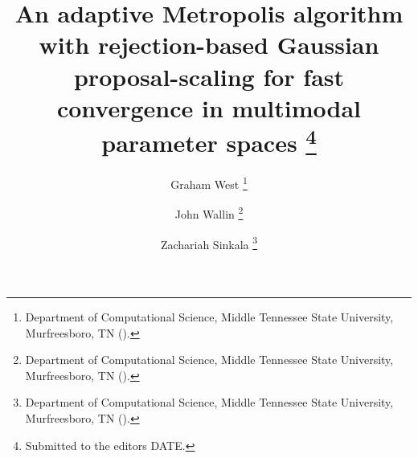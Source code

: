 

\usepackage{lipsum}
\usepackage{amsfonts}
\usepackage{graphicx}
\usepackage{epstopdf}
\usepackage{algorithmic}

\usepackage{textpos}
\usepackage{verbatim}
\usepackage{textcomp}
\usepackage{varwidth}
\ifpdf
\else
\fi

\usepackage{enumitem}

\newcommand{\creflastconjunction}{, and~}



\title{An adaptive Metropolis algorithm with rejection-based Gaussian proposal-scaling for fast convergence in multimodal parameter spaces \thanks{Submitted to the editors DATE.
}}

\author{Graham West \thanks{Department of Computational Science, Middle Tennessee State University, Murfreesboro, TN 
  ().}
\and John Wallin \thanks{Department of Computational Science, Middle Tennessee State University, Murfreesboro, TN ().}
\and Zachariah Sinkala \thanks{Department of Computational Science, Middle Tennessee State University, Murfreesboro, TN ().}
}

\usepackage{amsopn}
\DeclareMathOperator{\diag}{diag}


